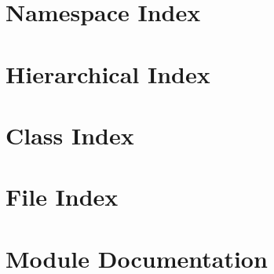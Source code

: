 \documentclass[twoside]{book}
\newcommand{\+}{\discretionary{\mbox{\scriptsize$\hookleftarrow$}}{}{}}
\begin{document}
\chapter{Namespace Index}

\chapter{Hierarchical Index}

\chapter{Class Index}

\chapter{File Index}

\chapter{Module Documentation}










































\end{document}
